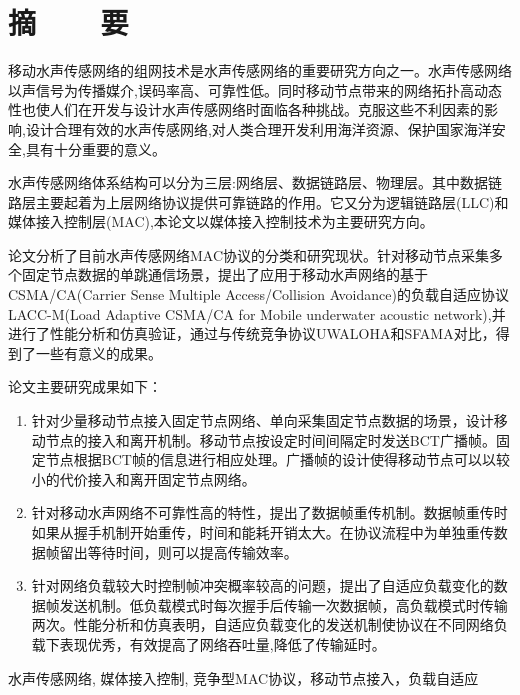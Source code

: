 \renewcommand{\baselinestretch}{1.5}
\fontsize{12pt}{13pt}\selectfont


\chapter{摘~~~~要}

移动水声传感网络的组网技术是水声传感网络的重要研究方向之一。水声传感网络以声信号为传播媒介,误码率高、可靠性低。同时移动节点带来的网络拓扑高动态性也使人们在开发与设计水声传感网络时面临各种挑战。克服这些不利因素的影响,设计合理有效的水声传感网络,对人类合理开发利用海洋资源、保护国家海洋安全,具有十分重要的意义。

水声传感网络体系结构可以分为三层:网络层、数据链路层、物理层。其中数据链路层主要起着为上层网络协议提供可靠链路的作用。它又分为逻辑链路层(LLC)和媒体接入控制层(MAC),本论文以媒体接入控制技术为主要研究方向。

论文分析了目前水声传感网络MAC协议的分类和研究现状。针对移动节点采集多个固定节点数据的单跳通信场景，提出了应用于移动水声网络的基于CSMA/CA(Carrier Sense Multiple Access/Collision Avoidance)的负载自适应协议LACC-M(Load Adaptive CSMA/CA for Mobile underwater acoustic network),并进行了性能分析和仿真验证，通过与传统竞争协议UWALOHA和SFAMA对比，得到了一些有意义的成果。

论文主要研究成果如下：
\vspace{-10pt}
\begin{enumerate}
	\item 针对少量移动节点接入固定节点网络、单向采集固定节点数据的场景，设计移动节点的接入和离开机制。移动节点按设定时间间隔定时发送BCT广播帧。固定节点根据BCT帧的信息进行相应处理。广播帧的设计使得移动节点可以以较小的代价接入和离开固定节点网络。
	\item 针对移动水声网络不可靠性高的特性，提出了数据帧重传机制。数据帧重传时如果从握手机制开始重传，时间和能耗开销太大。在协议流程中为单独重传数据帧留出等待时间，则可以提高传输效率。
	\item 
	针对网络负载较大时控制帧冲突概率较高的问题，提出了自适应负载变化的数据帧发送机制。低负载模式时每次握手后传输一次数据帧，高负载模式时传输两次。性能分析和仿真表明，自适应负载变化的发送机制使协议在不同网络负载下表现优秀，有效提高了网络吞吐量,降低了传输延时。
\end{enumerate}
\vspace{-10pt}

\vspace{1em}
 \quad 水声传感网络, 媒体接入控制, 竞争型MAC协议，移动节点接入，负载自适应

\clearpage
\endinput
